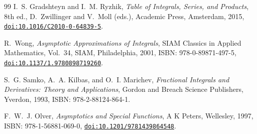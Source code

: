 \documentclass[11pt,a4paper]{article}
\theoremstyle{plain}
\theoremstyle{definition}
\theoremstyle{remark}
\numberwithin{equation}{section}
\providecommand{\doi}[1]{\href{https://doi.org/#1}{\texttt{doi:#1}}}
\begin{document}
\begin{thebibliography}{99}
I.~S. Gradshteyn and I.~M. Ryzhik,
\emph{Table of Integrals, Series, and Products},
8th ed., D.~Zwillinger and V.~Moll (eds.), Academic Press, Amsterdam, 2015,
\doi{10.1016/C2010-0-64839-5}.

R.~Wong,
\emph{Asymptotic Approximations of Integrals},
SIAM Classics in Applied Mathematics, Vol.~34, SIAM, Philadelphia, 2001,
ISBN: 978-0-89871-497-5,
\doi{10.1137/1.9780898719260}.

S.~G. Samko, A.~A. Kilbas, and O.~I. Marichev,
\emph{Fractional Integrals and Derivatives: Theory and Applications},
Gordon and Breach Science Publishers, Yverdon, 1993,
ISBN: 978-2-88124-864-1.


F.~W.~J. Olver,
\emph{Asymptotics and Special Functions},
A K Peters, Wellesley, 1997,
ISBN: 978-1-56881-069-0,
\doi{10.1201/9781439864548}.

\end{thebibliography}
\end{document}

